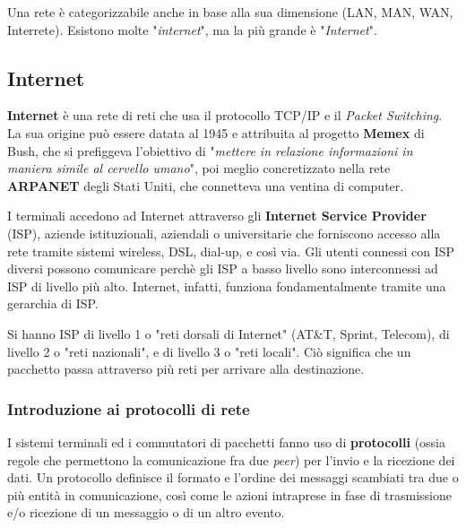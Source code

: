 Una rete è categorizzabile anche in base alla sua dimensione (LAN, MAN, WAN, Interrete). Esistono molte "\textit{internet}", ma la più grande è "\textit{Internet}".

\subsection{Internet}

\textbf{Internet} è una rete di reti che usa il protocollo TCP/IP e il \textit{Packet Switching}. La sua origine può essere datata al 1945 e attribuita al progetto \textbf{Memex} di Bush, che si prefiggeva l'obiettivo di "\textit{mettere in relazione informazioni in maniera simile al cervello umano}", poi meglio concretizzato nella rete \textbf{ARPANET} degli Stati Uniti, che connetteva una ventina di computer.

\vspace{3mm}

I terminali accedono ad Internet attraverso gli \textbf{Internet Service Provider} (ISP), aziende istituzionali, aziendali o universitarie che forniscono accesso alla rete tramite sistemi wireless, DSL, dial-up, e così via. Gli utenti connessi con ISP diversi possono comunicare perchè gli ISP a basso livello sono interconnessi ad ISP di livello più alto. Internet, infatti, funziona fondamentalmente tramite una gerarchia di ISP.

\vspace{3mm}

Si hanno ISP di livello 1 o "reti dorsali di Internet" (AT\&T, Sprint, Telecom), di livello 2 o "reti nazionali", e di livello 3 o "reti locali". Ciò significa che un pacchetto passa attraverso più reti per arrivare alla destinazione.

\subsubsection{Introduzione ai protocolli di rete}

\vspace{3mm}

I sistemi terminali ed i commutatori di pacchetti fanno uso di \textbf{protocolli} (ossia regole che permettono la comunicazione fra due \textit{peer}) per l’invio e la ricezione dei dati. Un protocollo definisce il formato e l’ordine dei messaggi scambiati tra due o più entità in comunicazione, così come le azioni intraprese in fase di trasmissione e/o ricezione di un messaggio o di un altro evento.

